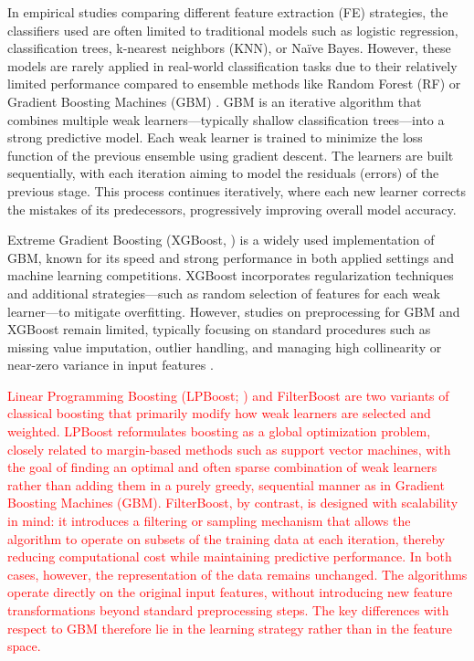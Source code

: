 \documentclass[11pt,a4paper]{article}
\providecommand{\DIFaddtex}[1]{\textcolor{red}{#1}}
\providecommand{\DIFaddbegin}{}
\providecommand{\DIFadd}[1]{\texorpdfstring{\DIFaddtex{#1}}{#1}}
\begin{document}
In empirical studies comparing different feature extraction (FE) strategies, the classifiers used are often limited to traditional models such as logistic regression, classification trees, k-nearest neighbors (KNN), or Na\"ive Bayes. However, these models are rarely applied in real-world classification tasks due to their relatively limited performance compared to ensemble methods like Random Forest (RF) or Gradient Boosting Machines (GBM) \citep{fernandez2014we,  chen2016xgboost}.
GBM is an iterative algorithm that combines multiple weak learners---typically shallow classification trees---into a strong predictive model. Each weak learner is trained to minimize the loss function of the previous ensemble using gradient descent. The learners are built sequentially, with each iteration aiming to model the residuals (errors) of the previous stage. This process continues iteratively, where each new learner corrects the mistakes of its predecessors, progressively improving overall model accuracy.

Extreme Gradient Boosting (XGBoost, \cite{chen2016xgboost}) is a widely used implementation of GBM, known for its speed and strong performance in both applied settings and machine learning competitions. XGBoost incorporates regularization techniques and additional strategies---such as random selection of features for each weak learner---to mitigate overfitting.
However, studies on preprocessing for GBM and XGBoost remain limited, typically focusing on standard procedures such as missing value imputation, outlier handling, and managing high collinearity or near-zero variance in input features \citep{gabriel2023optimizing, chen2016xgboost}.
\DIFaddbegin
\DIFadd{Linear Programming Boosting (LPBoost; \citep{demiriz2002lpboost}) and FilterBoost \citep{bradley2008filterboost} are two variants of classical boosting that primarily modify how weak learners are selected and weighted. LPBoost reformulates boosting as a global optimization problem, closely related to margin-based methods such as support vector machines, with the goal of finding an optimal and often sparse combination of weak learners rather than adding them in a purely greedy, sequential manner as in Gradient Boosting Machines (GBM). FilterBoost, by contrast, is designed with scalability in mind: it introduces a filtering or sampling mechanism that allows the algorithm to operate on subsets of the training data at each iteration, thereby reducing computational cost while maintaining predictive performance. In both cases, however, the representation of the data remains unchanged. The algorithms operate directly on the original input features, without introducing new feature transformations beyond standard preprocessing steps. The key differences with respect to GBM therefore lie in the learning strategy rather than in the feature space.}
\end{document}
